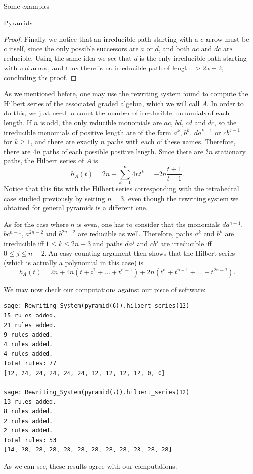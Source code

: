 \begin{chapter}{Some examples}
\begin{section}{Pyramids}
\begin{proof}
Finally, we notice that an irreducible path starting with a $c$ arrow must be $c$ itself, since the only possible successors are $a$ or $d$, and both $ac$ and $dc$ are reducible. Using the same idea we see that $d$ is the only irreducible path starting with a $d$ arrow, and thus there is no irreducible path of length $>2n-2$, concluding the proof.
\end{proof}
As we mentioned before, one may use the rewriting system found to compute the Hilbert series of the associated graded algebra, which we will call $A$. In order to do this, we just need to count the number of irreducible monomials of each length. If $n$ is odd, the only reducible monomials are $ac$, $bd$, $cd$ and $dc$, so the irreducible monomials of positive length are of the form $a^k$, $b^k$, $da^{k-1}$ or $cb^{k-1}$ for $k\geq 1$, and there are exactly $n$ paths with each of these names. Therefore, there are $4n$ paths of each possible positive length. Since there are $2n$ stationary paths, the Hilbert series of $A$ is
\[h_A(t) = 2n + \sum_{k=1}^\infty 4nt^k=-2n\frac{t+1}{t-1}.\]
Notice that this fits with the Hilbert series corresponding with the tetrahedral case studied previously by setting $n=3$, even though the rewriting system we obtained for general pyramids is a different one.

As for the case where $n$ is even, one has to consider that the monomials $da^{n-1}$, $bc^{n-1}$, $a^{2n-2}$ and $b^{2n-2}$ are reducible as well. Therefore, paths $a^k$ and $b^k$ are irreducible iff $1\leq k\leq 2n-3$ and paths $da^j$ and $cb^j$ are irreducible iff $0\leq j \leq n-2$. An easy counting argument then shows that the Hilbert series (which is actually a polynomial in this case) is
\[h_A(t) = 2n + 4n(t + t^2 + \dots + t^{n-1}) + 2n(t^n + t^{n+1} + \dots + t^{2n-3}).\]

We may now check our computations against our piece of software:
\begin{lstlisting}
sage: Rewriting_System(pyramid(6)).hilbert_series(12)
15 rules added.
21 rules added.
9 rules added.
4 rules added.
4 rules added.
Total rules: 77
[12, 24, 24, 24, 24, 24, 12, 12, 12, 12, 0, 0]

sage: Rewriting_System(pyramid(7)).hilbert_series(12)
13 rules added.
8 rules added.
2 rules added.
2 rules added.
Total rules: 53
[14, 28, 28, 28, 28, 28, 28, 28, 28, 28, 28, 28]
\end{lstlisting}
As we can see, these results agree with our computations.
\end{section}


\end{chapter}
